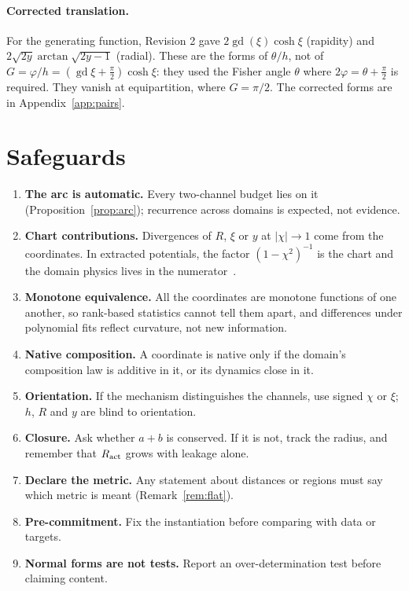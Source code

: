\documentclass[11pt]{article}
\theoremstyle{definition}
\theoremstyle{remark}
\newcommand{\gd}{\operatorname{gd}}
\begin{document}
\paragraph{Corrected translation.} For the generating function, Revision 2 gave
$2\gd(\xi)\cosh\xi$ (rapidity) and $2\sqrt{2y}\arctan\sqrt{2y-1}$ (radial). These are the
forms of $\theta/h$, not of $G=\varphi/h=(\gd\xi+\tfrac\pi2)\cosh\xi$: they used the Fisher
angle $\theta$ where $2\varphi=\theta+\tfrac\pi2$ is required. They vanish at equipartition,
where $G=\pi/2$. The corrected forms are in Appendix~\ref{app:pairs}.

\section{Safeguards}\label{sec:safeguards}

\begin{enumerate}\sloppy
\item \textbf{The arc is automatic.} Every two-channel budget lies on it
(Proposition~\ref{prop:arc}); recurrence across domains is expected, not evidence.
\item \textbf{Chart contributions.} Divergences of $R$, $\xi$ or $y$ at $|\chi|\to1$ come
from the coordinates. In extracted potentials, the factor $(1-\chi^2)^{-1}$ is the chart and
the domain physics lives in the numerator~\cite{DeJesus2026EP}.
\item \textbf{Monotone equivalence.} All the coordinates are monotone functions of one
another, so rank-based statistics cannot tell them apart, and differences under polynomial
fits reflect curvature, not new information.
\item \textbf{Native composition.} A coordinate is native only if the domain's composition
law is additive in it, or its dynamics close in it.
\item \textbf{Orientation.} If the mechanism distinguishes the channels, use signed $\chi$
or $\xi$; $h$, $R$ and $y$ are blind to orientation.
\item \textbf{Closure.} Ask whether $a+b$ is conserved. If it is not, track the radius, and
remember that $R_{\rm act}$ grows with leakage alone.
\item \textbf{Declare the metric.} Any statement about distances or regions must say which
metric is meant (Remark~\ref{rem:flat}).
\item \textbf{Pre-commitment.} Fix the instantiation before comparing with data or targets.
\item \textbf{Normal forms are not tests.} Report an over-determination test before claiming
content.
\end{enumerate}
\end{document}
